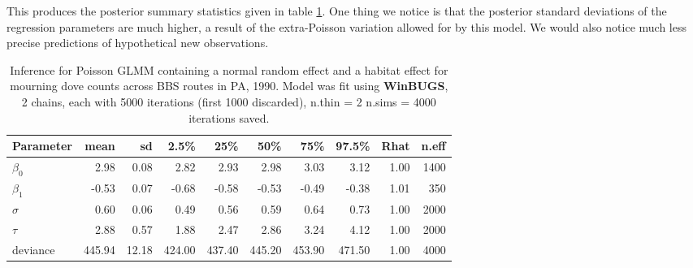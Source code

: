 This produces the posterior summary statistics given in table \ref{glms.tab.bbspoisreg}. 
One thing we notice is
that the posterior standard deviations of the regression parameters
are much higher, a result of the extra-Poisson variation allowed for
by this model. We would also
notice much less precise predictions of hypothetical new
observations.



\begin{table}
\caption{Inference for Poisson GLMM containing a normal random effect
and a  habitat effect for mourning
  dove counts across BBS routes in PA, 1990. Model was fit using 
{\bf WinBUGS},
 2 chains, each with 5000 iterations (first 1000 discarded), n.thin = 2
 n.sims = 4000 iterations saved.}
   \scriptsize
  \begin{tabular}{lrrrrrrrrr}
    \hline
        \hline
 Parameter &    mean   & sd   &  2.5\%    &  25\%  &    50\%   &   75\%  &  97.5\% & Rhat & n.eff \\
     \hline
$\beta_0$   &   2.98 & 0.08 &  2.82 &  2.93  & 2.98 &  3.03 &  3.12 & 1.00 & 1400 \\
$\beta_1$   &  -0.53 & 0.07 & -0.68 & -0.58 & -0.53 & -0.49 & -0.38 & 1.01 &  350 \\
$\sigma$   &   0.60 & 0.06 &  0.49 &  0.56 &  0.59 &  0.64 &  0.73 & 1.00 & 2000 \\
$\tau$     &   2.88 & 0.57 &  1.88 &  2.47 &  2.86 &  3.24 &  4.12 & 1.00 & 2000 \\
deviance & 445.94 & 12.18 & 424.00 & 437.40 & 445.20 & 453.90 & 471.50 & 1.00 & 4000 \\
    \hline
  \end{tabular}
  \label{glms.tab.bbspoisreg}
\vspace{0.5cm}
\end{table}



